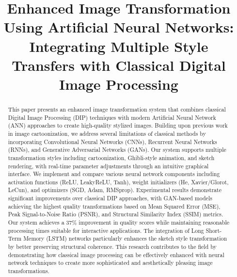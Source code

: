 \documentclass[conference]{IEEEtran}
\begin{document}
\title{Enhanced Image Transformation Using Artificial Neural Networks: Integrating Multiple Style Transfers with Classical Digital Image Processing}

\author{
\and
{}
}

\maketitle

\begin{abstract}
This paper presents an enhanced image transformation system that combines classical Digital Image Processing (DIP) techniques with modern Artificial Neural Network (ANN) approaches to create high-quality stylized images. Building upon previous work in image cartoonization, we address several limitations of classical methods by incorporating Convolutional Neural Networks (CNNs), Recurrent Neural Networks (RNNs), and Generative Adversarial Networks (GANs). Our system supports multiple transformation styles including cartoonization, Ghibli-style animation, and sketch rendering, with real-time parameter adjustments through an intuitive graphical interface. We implement and compare various neural network components including activation functions (ReLU, LeakyReLU, Tanh), weight initializers (He, Xavier/Glorot, LeCun), and optimizers (SGD, Adam, RMSprop). Experimental results demonstrate significant improvements over classical DIP approaches, with GAN-based models achieving the highest quality transformations based on Mean Squared Error (MSE), Peak Signal-to-Noise Ratio (PSNR), and Structural Similarity Index (SSIM) metrics. Our system achieves a 37\% improvement in quality scores while maintaining reasonable processing times suitable for interactive applications. The integration of Long Short-Term Memory (LSTM) networks particularly enhances the sketch style transformation by better preserving structural coherence. This research contributes to the field by demonstrating how classical image processing can be effectively enhanced with neural network techniques to create more sophisticated and aesthetically pleasing image transformations.
\end{abstract}
\end{document}
